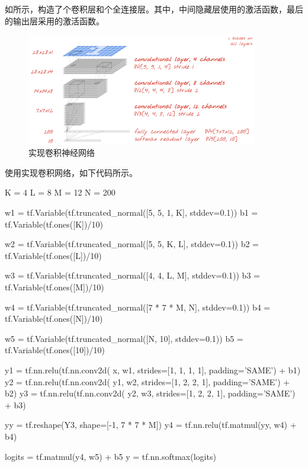 \begin{content}
如所示，构造了个卷积层和个全连接层。其中，中间隐藏层使用的激活函数，最后的输出层采用的激活函数。

\begin{figure}[H]
\centering
\includegraphics[width=0.9\textwidth]{figures/mnist-conv2d-1.png}
\caption{实现卷积神经网络}
 \label{fig:mnist-conv2d-1}
\end{figure}

使用\tf{}实现卷积网络，如下代码所示。

\begin{leftbar}
\begin{python}
K = 4 
L = 8
M = 12
N = 200

w1 = tf.Variable(tf.truncated_normal([5, 5, 1, K], stddev=0.1))
b1 = tf.Variable(tf.ones([K])/10)

w2 = tf.Variable(tf.truncated_normal([5, 5, K, L], stddev=0.1))
b2 = tf.Variable(tf.ones([L])/10)

w3 = tf.Variable(tf.truncated_normal([4, 4, L, M], stddev=0.1))
b3 = tf.Variable(tf.ones([M])/10)

w4 = tf.Variable(tf.truncated_normal([7 * 7 * M, N], stddev=0.1))
b4 = tf.Variable(tf.ones([N])/10)

w5 = tf.Variable(tf.truncated_normal([N, 10], stddev=0.1))
b5 = tf.Variable(tf.ones([10])/10)

y1 = tf.nn.relu(tf.nn.conv2d(
       x,  w1, strides=[1, 1, 1, 1], padding='SAME') + b1)
y2 = tf.nn.relu(tf.nn.conv2d(
       y1, w2, strides=[1, 2, 2, 1], padding='SAME') + b2)
y3 = tf.nn.relu(tf.nn.conv2d(
       y2, w3, strides=[1, 2, 2, 1], padding='SAME') + b3)

yy = tf.reshape(Y3, shape=[-1, 7 * 7 * M])
y4 = tf.nn.relu(tf.matmul(yy, w4) + b4)

logits = tf.matmul(y4, w5) + b5
y = tf.nn.softmax(logits)
\end{python}
\end{leftbar}


\end{content}
